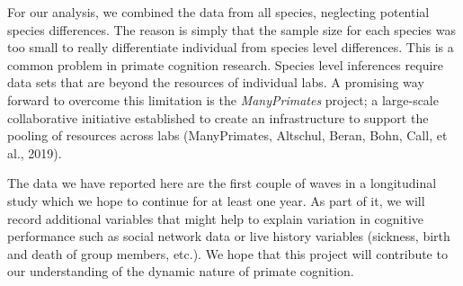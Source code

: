 \documentclass[10pt, letterpaper]{article}
\begin{document}
For our analysis, we combined the data from all species, neglecting
potential species differences. The reason is simply that the sample size
for each species was too small to really differentiate individual from
species level differences. This is a common problem in primate cognition
research. Species level inferences require data sets that are beyond the
resources of individual labs. A promising way forward to overcome this
limitation is the \emph{ManyPrimates} project; a large-scale
collaborative initiative established to create an infrastructure to
support the pooling of resources across labs (ManyPrimates, Altschul,
Beran, Bohn, Call, et al., 2019).

The data we have reported here are the first couple of waves in a
longitudinal study which we hope to continue for at least one year. As
part of it, we will record additional variables that might help to
explain variation in cognitive performance such as social network data
or live history variables (sickness, birth and death of group members,
etc.). We hope that this project will contribute to our understanding of
the dynamic nature of primate cognition.
\end{document}
